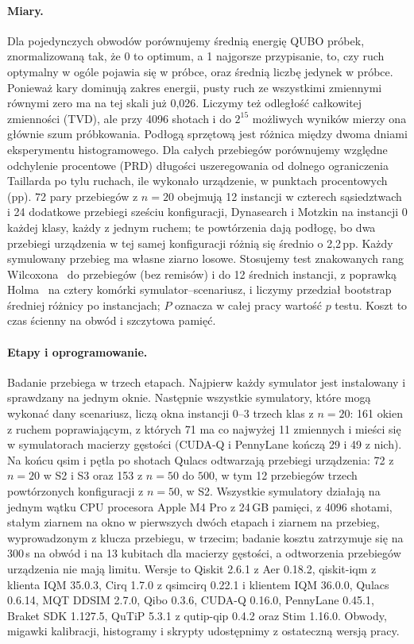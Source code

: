 \documentclass{scspaperproc}
\begin{document}
\paragraph{Miary.}
Dla pojedynczych obwodów porównujemy średnią energię QUBO próbek,
znormalizowaną tak, że 0 to optimum, a 1 najgorsze przypisanie, to, czy ruch
optymalny w ogóle pojawia się w próbce, oraz średnią liczbę jedynek w próbce.
Ponieważ kary dominują zakres energii, pusty ruch ze wszystkimi zmiennymi
równymi zero ma na tej skali już 0,026. Liczymy też odległość całkowitej
zmienności (TVD), ale przy 4096 shotach i do $2^{15}$ możliwych wyników mierzy
ona głównie szum próbkowania. Podłogą sprzętową jest różnica między dwoma
dniami eksperymentu histogramowego. Dla całych przebiegów porównujemy względne
odchylenie procentowe (PRD) długości uszeregowania od dolnego ograniczenia
Taillarda po tylu ruchach, ile wykonało urządzenie, w punktach procentowych
(pp). 72 pary przebiegów z $n = 20$ obejmują 12 instancji w czterech
sąsiedztwach i 24 dodatkowe przebiegi sześciu konfiguracji, Dynasearch
i Motzkin na instancji 0 każdej klasy, każdy z jednym ruchem; te powtórzenia
dają podłogę, bo dwa przebiegi urządzenia w tej samej konfiguracji różnią się
średnio o 2,2\,pp. Każdy symulowany przebieg ma własne ziarno losowe.
Stosujemy test znakowanych rang Wilcoxona~\cite{wilcoxon1945} do przebiegów
(bez remisów) i do 12 średnich instancji, z poprawką Holma~\cite{holm1979} na
cztery komórki symulator--scenariusz, i liczymy przedział
bootstrap~\cite{efron1993bootstrap} średniej różnicy po instancjach; $P$
oznacza w całej pracy wartość $p$ testu. Koszt to czas ścienny na obwód
i szczytowa pamięć.

\paragraph{Etapy i oprogramowanie.}
Badanie przebiega w trzech etapach. Najpierw każdy symulator jest instalowany
i sprawdzany na jednym oknie. Następnie wszystkie symulatory, które mogą
wykonać dany scenariusz, liczą okna instancji 0--3 trzech klas z $n = 20$: 161
okien z ruchem poprawiającym, z których 71 ma co najwyżej 11 zmiennych
i mieści się w symulatorach macierzy gęstości (CUDA-Q i PennyLane kończą 29
i 49 z nich). Na końcu qsim i pętla po shotach Qulacs odtwarzają przebiegi
urządzenia: 72 z $n = 20$ w S2 i S3 oraz 153 z $n = 50$ do $500$, w tym 12
przebiegów trzech powtórzonych konfiguracji z $n = 50$, w S2. Wszystkie
symulatory działają na jednym wątku CPU procesora Apple M4 Pro z 24\,GB
pamięci, z 4096 shotami, stałym ziarnem na okno w pierwszych dwóch etapach
i ziarnem na przebieg, wyprowadzonym z klucza przebiegu, w trzecim; badanie
kosztu zatrzymuje się na 300\,s na obwód i na 13 kubitach dla macierzy
gęstości, a odtworzenia przebiegów urządzenia nie mają limitu. Wersje to
Qiskit 2.6.1 z Aer 0.18.2, qiskit-iqm z klienta IQM 35.0.3, Cirq 1.7.0
z qsimcirq 0.22.1 i klientem IQM 36.0.0, Qulacs 0.6.14, MQT DDSIM 2.7.0, Qibo
0.3.6, CUDA-Q 0.16.0, PennyLane 0.45.1, Braket SDK 1.127.5, QuTiP 5.3.1
z qutip-qip 0.4.2 oraz Stim 1.16.0. Obwody, migawki kalibracji, histogramy
i skrypty udostępnimy z ostateczną wersją pracy.
\end{document}
